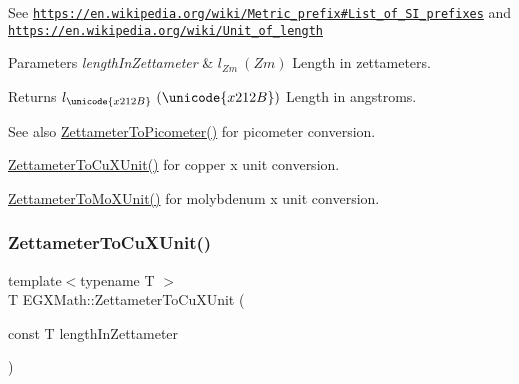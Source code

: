 See \href{https://en.wikipedia.org/wiki/Metric_prefix#List_of_SI_prefixes}{\tt https\+://en.\+wikipedia.\+org/wiki/\+Metric\+\_\+prefix\#\+List\+\_\+of\+\_\+\+S\+I\+\_\+prefixes} and \href{https://en.wikipedia.org/wiki/Unit_of_length}{\tt https\+://en.\+wikipedia.\+org/wiki/\+Unit\+\_\+of\+\_\+length} 
\begin{DoxyParams}{Parameters}
{\em length\+In\+Zettameter} & $ l_{Zm}\ (Zm)$ Length in zettameters. \\
\hline
\end{DoxyParams}
\begin{DoxyReturn}{Returns}
$ l_{\unicode{x212B}}\ (\unicode{x212B})$ Length in angstroms. 
\end{DoxyReturn}
\begin{DoxySeeAlso}{See also}
\mbox{\hyperlink{group___e_g_x_math-_conversions-_length_conversions-_zettameter-_s_i_gae7835234c6727bbfd1e9ad40c54a4740}{Zettameter\+To\+Picometer()}} for picometer conversion. 

\mbox{\hyperlink{group___e_g_x_math-_conversions-_length_conversions-_zettameter-_non-_s_i_ga91f2890d91086a45ad9d2b5e7e82b60a}{Zettameter\+To\+Cu\+X\+Unit()}} for copper x unit conversion. 

\mbox{\hyperlink{group___e_g_x_math-_conversions-_length_conversions-_zettameter-_non-_s_i_ga10039261b7de3417e69110a56312b9ef}{Zettameter\+To\+Mo\+X\+Unit()}} for molybdenum x unit conversion. 
\end{DoxySeeAlso}
\mbox{\label{group___e_g_x_math-_conversions-_length_conversions-_zettameter-_non-_s_i_ga91f2890d91086a45ad9d2b5e7e82b60a}} 
\subsubsection{\texorpdfstring{Zettameter\+To\+Cu\+X\+Unit()}{ZettameterToCuXUnit()}}
{\footnotesize\ttfamily template$<$typename T $>$ \\
T E\+G\+X\+Math\+::\+Zettameter\+To\+Cu\+X\+Unit (\begin{DoxyParamCaption}\item[{const T}]{length\+In\+Zettameter }\end{DoxyParamCaption})}



